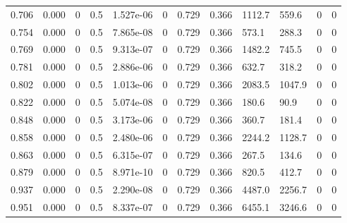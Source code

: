 \documentclass[preview]{standalone}
\begin{document}
{{\begin{tabular}{L{1.2cm}C{1.2cm} C{0.3cm}C{0.5cm} C{1.4cm}C{1.4cm} C{1.4cm}C{1.4cm} C{1.6cm}C{1.6cm} C{1.6cm}C{1.6cm}}
  0.706  &  0.000  & 0     & 0.5 &  1.527e-06  & 0  &  0.729&   0.366& 1112.7 & 559.6   &  0 & 0  \\ 
  0.754  &  0.000  & 0     & 0.5 &  7.865e-08  & 0  &  0.729&   0.366& 573.1 & 288.3   &  0 & 0  \\ 
  0.769  &  0.000  & 0     & 0.5 &  9.313e-07  & 0  &  0.729&   0.366& 1482.2 & 745.5   &  0 & 0  \\ 
  0.781  &  0.000  & 0     & 0.5 &  2.886e-06  & 0  &  0.729&   0.366& 632.7 & 318.2   &  0 & 0  \\ 
  0.802  &  0.000  & 0     & 0.5 &  1.013e-06  & 0  &  0.729&   0.366& 2083.5 & 1047.9   &  0 & 0  \\ 
  0.822  &  0.000  & 0     & 0.5 &  5.074e-08  & 0  &  0.729&   0.366& 180.6 & 90.9   &  0 & 0  \\ 
  0.848  &  0.000  & 0     & 0.5 &  3.173e-06  & 0  &  0.729&   0.366& 360.7 & 181.4   &  0 & 0  \\ 
  0.858  &  0.000  & 0     & 0.5 &  2.480e-06  & 0  &  0.729&   0.366& 2244.2 & 1128.7   &  0 & 0  \\ 
  0.863  &  0.000  & 0     & 0.5 &  6.315e-07  & 0  &  0.729&   0.366& 267.5 & 134.6   &  0 & 0  \\ 
  0.879  &  0.000  & 0     & 0.5 &  8.971e-10  & 0  &  0.729&   0.366& 820.5 & 412.7   &  0 & 0  \\ 
  0.937  &  0.000  & 0     & 0.5 &  2.290e-08  & 0  &  0.729&   0.366& 4487.0 & 2256.7   &  0 & 0  \\ 
  0.951  &  0.000  & 0     & 0.5 &  8.337e-07  & 0  &  0.729&   0.366& 6455.1 & 3246.6   &  0 & 0  \\ 
\hline 
\end{tabular} 

}}
\end{document}
